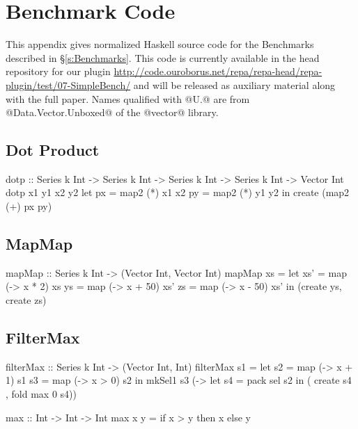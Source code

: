 \section{Benchmark Code}
This appendix gives normalized Haskell source code for the Benchmarks described in \S\ref{s:Benchmarks}. This code is currently available in the head repository for our plugin \url{http://code.ouroborus.net/repa/repa-head/repa-plugin/test/07-SimpleBench/} and will be released as auxiliary material along with the full paper. Names qualified with @U.@ are from @Data.Vector.Unboxed@ of the @vector@ library.

\subsection{Dot Product}

\begin{small}
\begin{code}
dotp :: Series k Int -> Series k Int
     -> Series k Int -> Series k Int
     -> Vector   Int
dotp x1 y1 x2 y2
 let px    = map2 (*) x1 x2
     py    = map2 (*) y1 y2
 in  create (map2 (+) px py)
\end{code}
\end{small}

\subsection{MapMap}
\begin{small}
\begin{code}
mapMap     :: Series k Int 
           -> (Vector Int, Vector Int)
mapMap xs
 = let xs' = map (\x -> x * 2)  xs
       ys  = map (\x -> x + 50) xs'
       zs  = map (\x -> x - 50) xs'
   in  (create ys, create zs)
\end{code}
\end{small}


\subsection{FilterMax}
\begin{small}
\begin{code}
filterMax :: Series k Int -> (Vector Int, Int)
filterMax s1
 = let  s2      = map (\x -> x + 1) s1
        s3      = map (\x -> x > 0) s2
   in   mkSel1 s3 
         (\sel -> let s4   = pack sel s2
                  in  ( create s4
                      , fold max 0 s4))

max :: Int -> Int -> Int
max x y = if x > y then x else y
\end{code}
\end{small}


